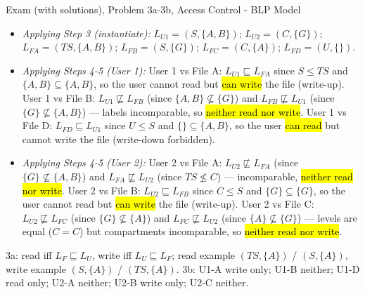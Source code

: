 \documentclass[12pt, a4paper]{article}
\newcommand{\imp}[1]{\hl{#1}}                       %
\begin{document}
\begin{practicebox}{Exam (with solutions), Problem 3a-3b, Access Control - BLP Model}
\begin{itemize}
    Example where write is allowed: $L_{U1} = (S, \{A\})$, $L_{F1} = (TS, \{A\})$ (blind write-up).
    \item \textit{Applying Step 3 (instantiate):} $L_{U1} = (S, \{A, B\})$; $L_{U2} = (C, \{G\})$; $L_{FA} = (TS, \{A, B\})$; $L_{FB} = (S, \{G\})$; $L_{FC} = (C, \{A\})$; $L_{FD} = (U, \{\})$.
    \item \textit{Applying Steps 4-5 (User 1):} User 1 vs File A: $L_{U1} \sqsubseteq L_{FA}$ since $S \leq TS$ and $\{A,B\} \subseteq \{A,B\}$, so the user cannot read but \imp{can write} the file (write-up).
    User 1 vs File B: $L_{U1} \not\sqsubseteq L_{FB}$ (since $\{A,B\} \not\subseteq \{G\}$) and $L_{FB} \not\sqsubseteq L_{U1}$ (since $\{G\} \not\subseteq \{A,B\}$) --- labels incomparable, so \imp{neither read nor write}.
    User 1 vs File D: $L_{FD} \sqsubseteq L_{U1}$ since $U \leq S$ and $\{\} \subseteq \{A,B\}$, so the user \imp{can read} but cannot write the file (write-down forbidden).
    \item \textit{Applying Steps 4-5 (User 2):} User 2 vs File A: $L_{U2} \not\sqsubseteq L_{FA}$ (since $\{G\} \not\subseteq \{A,B\}$) and $L_{FA} \not\sqsubseteq L_{U2}$ (since $TS \not\leq C$) --- incomparable, \imp{neither read nor write}.
    User 2 vs File B: $L_{U2} \sqsubseteq L_{FB}$ since $C \leq S$ and $\{G\} \subseteq \{G\}$, so the user cannot read but \imp{can write} the file (write-up).
    User 2 vs File C: $L_{U2} \not\sqsubseteq L_{FC}$ (since $\{G\} \not\subseteq \{A\}$) and $L_{FC} \not\sqsubseteq L_{U2}$ (since $\{A\} \not\subseteq \{G\}$) --- levels are equal ($C = C$) but compartments incomparable, so \imp{neither read nor write}.
\end{itemize}

\begin{answerbox}
3a: read iff $L_F \sqsubseteq L_U$, write iff $L_U \sqsubseteq L_F$; read example $(TS,\{A\})$ / $(S,\{A\})$, write example $(S,\{A\})$ / $(TS,\{A\})$. 3b: U1-A write only; U1-B neither; U1-D read only; U2-A neither; U2-B write only; U2-C neither.
\end{answerbox}
\end{practicebox}
\end{document}

